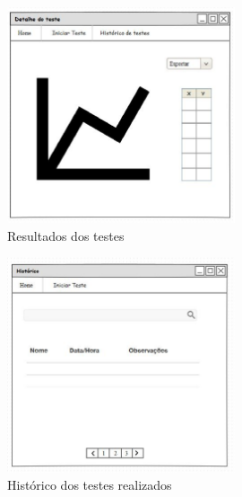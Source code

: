 	\begin{figure}[p]
		\centering
		\includegraphics[width=0.6\textwidth]{resource/detalheteste.eps}
		\caption{Resultados dos testes}
		\label{img:detalhe}
	\end{figure}
	
	\begin{figure}[!h]
		\centering
		\includegraphics[width=0.6\textwidth]{resource/historico.eps}
		\caption{Histórico dos testes realizados}
		\label{img:historico}
	\end{figure}

